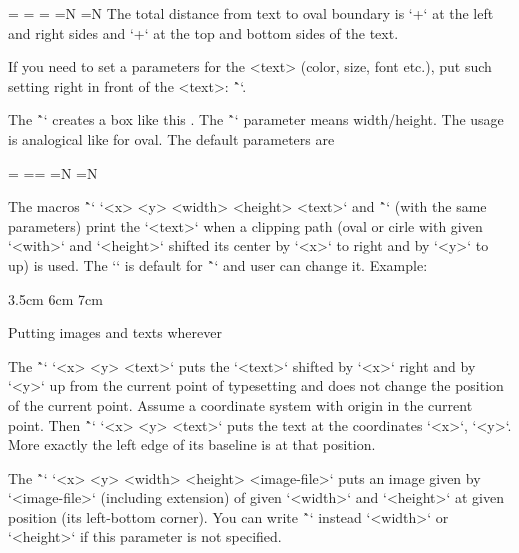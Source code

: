 {\begtt
\ovalparams={\roundness=2pt           %
             \fcolor=\Yellow          %
             \lcolor=\Red             %
             \lwidth=0.5bp            %
             \shadow=N                %
             \overlapmargins=N        %
             \hhkern=0pt \vvkern=0pt} %
\endtt
The total distance from text to oval boundary is `\hhkern+\roundness` at the left and right
sides and
`\vvkern+\roundness` at the top and bottom sides of the text.

If you need to set a parameters for the <text> (color, size, font etc.),
put such setting right in front of the <text>:
\^``.

\new
The \^`` creates a box like this .
The \^`\ratio` parameter means width/height. The usage is analogical like for oval.
The default parameters are

\begtt
\circleparams={ \fcolor=\Yellow \lcolor=\Red \lwidth=0.5bp
               \shadow=N \overlapmargins=N \hhkern=2pt \vvkern=2pt}
\endtt

\new
The macros \^`\clipinoval` `<x> <y> <width> <height> {<text>}`
and \^`\clipincircle` (with the same parameters)
print the `<text>` when a clipping path (oval or cirle with given
`<with>` and `<height>` shifted its center by `<x>` to right and by `<y>` to up)
is used.
The `\roundness=5mm` is default for \^`\clipinoval` and user can change it.
Example:

\begtt
\clipincircle 3cm 3.5cm 6cm 7cm {\picw=6cm }
\endtt

\secc Putting images and texts wherever

\new
The \^`\puttext` `<x> <y> {<text>}` puts the `<text>` shifted by `<x>` right and by
`<y>` up from the current point of typesetting and does not change the
position of the current point. Assume a coordinate system with origin in the
current point. Then \^`\puttext` `<x> <y> {<text>}` puts the text at the
coordinates `<x>`, `<y>`. More exactly the left edge of its baseline is at that
position.

\new
The \^`\putpic` `<x> <y> <width> <height> {<image-file>}` puts an image
given by `<image-file>` (including extension) of given
`<width>` and `<height>` at given position (its left-bottom corner).
You can write \^`\nospec` instead `<width>` or `<height>` if this parameter
is not specified.

}
